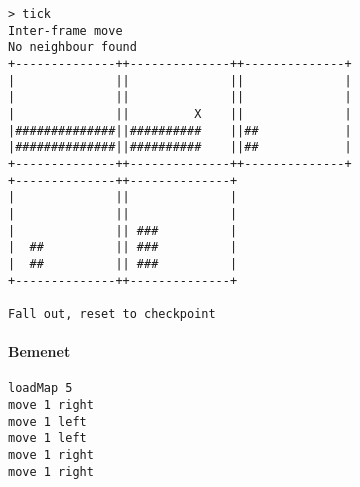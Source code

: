 \begin{verbatim}
> tick
Inter-frame move
No neighbour found
+--------------++--------------++--------------+
|              ||              ||              |
|              ||              ||              |
|              ||         X    ||              |
|##############||##########    ||##            |
|##############||##########    ||##            |
+--------------++--------------++--------------+
+--------------++--------------+                
|              ||              |                
|              ||              |                
|              || ###          |                
|  ##          || ###          |                
|  ##          || ###          |                
+--------------++--------------+                

Fall out, reset to checkpoint
\end{verbatim}
		        
		        \paragraph*{Bemenet}
\begin{verbatim}
loadMap 5
move 1 right
move 1 left
move 1 left
move 1 right
move 1 right
\end{verbatim}
